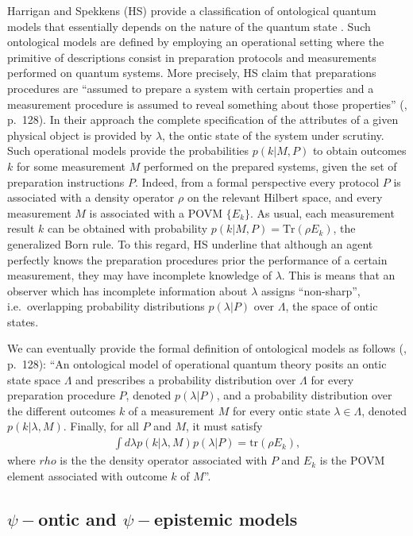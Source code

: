 \documentclass[twocolumn,prl,floatfix,superscriptaddress]{revtex4-2}
\begin{document}
Harrigan and Spekkens (HS) provide a classification of ontological quantum models that essentially depends on the nature of the quantum state \cite{Harrigan:2010}. Such ontological models are defined by employing an operational setting where the primitive of descriptions consist in preparation protocols and measurements performed on quantum systems. More precisely, HS claim that preparations procedures are ``assumed to prepare a system with certain properties and a measurement procedure is assumed to reveal something about those properties'' (\cite{Harrigan:2010}, p.\ 128). In their approach the complete specification of the attributes of a given physical object is provided by $\lambda$, the ontic state of the system under scrutiny. Such operational models provide the probabilities $p(k|M, P)$ to obtain outcomes $k$ for some measurement $M$ performed on the prepared systems, given the set of preparation instructions $P$. Indeed, from a formal perspective every protocol $P$ is associated with a density operator $\rho$ on the relevant Hilbert space, and every measurement $M$ is associated with a POVM $\{ E_k\}$. As usual, each measurement result $k$ can be obtained with probability $p(k|M, P)=\textrm{Tr}(\rho E_k)$, the generalized Born rule. To this regard, HS underline that although an agent perfectly knows the preparation procedures prior the performance of a certain measurement, they may have incomplete knowledge of $\lambda$. This is means that an observer which has incomplete information about $\lambda$ assigns ``non-sharp'', i.e.\ overlapping probability distributions $p(\lambda| P)$ over $\Lambda$, the space of ontic states. 

We can eventually provide the formal definition of ontological models as follows (\cite{Harrigan:2010}, p.\ 128): ``An ontological model of operational quantum theory posits an ontic state space $\Lambda$ and prescribes a probability distribution over $\Lambda$ for every preparation procedure $P$, denoted $p(\lambda| P)$, and a probability distribution over the different outcomes $k$ of a measurement $M$ for every ontic state $\lambda \in \Lambda$, denoted $p(k|\lambda, M)$. Finally, for all $P$ and $M$, it must satisfy
\begin{align*}
\int d\lambda p(k|\lambda, M) p(\lambda| P)= \textrm{tr}(\rho E_k),
\end{align*}
\noindent where $rho$ is the the density operator associated with $P$ and $E_k$ is the POVM element associated with outcome $k$ of $M$''.

\subsection{$\psi-$ontic and $\psi-$epistemic models}
\end{document}
